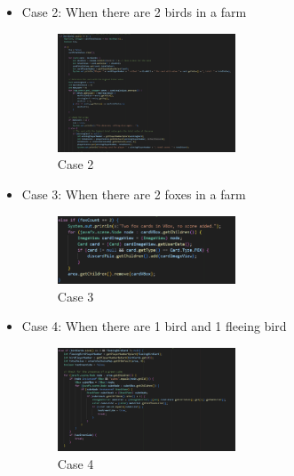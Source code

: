 \documentclass[conference]{IEEEtran}
\begin{document}
\begin{itemize}
    \vspace{6.5cm}
    \item Case 2: When there are 2 birds in a farm
    \begin{figure}[h!]
        \centering
        \includegraphics[width=0.5\textwidth]{img/Screenshot 2025-01-14 125854.png} %
        \caption{Case 2}
        \label{fig:case}
    \end{figure}
    \item Case 3: When there are 2 foxes in a farm
    \vspace{0.1cm}
    \begin{figure}[h!]
        \centering
        \includegraphics[width=0.5\textwidth]{img/Screenshot 2025-01-14 130028.png} %
        \caption{Case 3}
        \label{fig:case}
    \end{figure}
    \vspace{1cm}
    \item Case 4: When there are 1 bird and 1 fleeing bird
    \begin{figure}[h!]
        \centering
        \includegraphics[width=0.5\textwidth]{img/Screenshot 2025-01-14 130113.png} %
        \caption{Case 4}
        \label{fig:case}
    \end{figure}
    \begin{figure}[h!]
        \centering

\end{figure}
\end{itemize}
\end{document}
